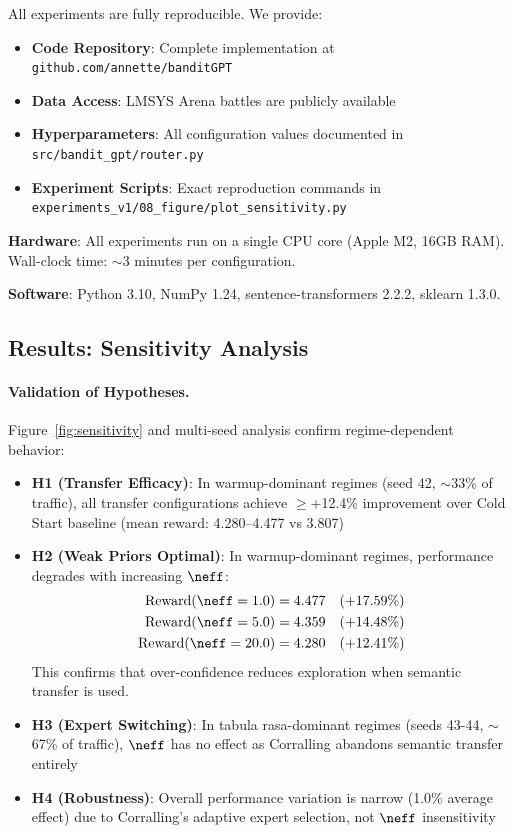 All experiments are fully reproducible. We provide:
\begin{itemize}[leftmargin=*, itemsep=2pt]
    \item \textbf{Code Repository}: Complete implementation at \texttt{github.com/annette/banditGPT}
    \item \textbf{Data Access}: LMSYS Arena battles are publicly available~\cite{zheng2023judging}
    \item \textbf{Hyperparameters}: All configuration values documented in \texttt{src/bandit\_gpt/router.py}
    \item \textbf{Experiment Scripts}: Exact reproduction commands in \texttt{experiments\_v1/08\_figure/plot\_sensitivity.py}
\end{itemize}

\textbf{Hardware}: All experiments run on a single CPU core (Apple M2, 16GB RAM). Wall-clock time: $\sim$3 minutes per configuration.

\textbf{Software}: Python 3.10, NumPy 1.24, sentence-transformers 2.2.2, sklearn 1.3.0.

\subsection{Results: Sensitivity Analysis}
\label{sec:sensitivity_results}

\paragraph{Validation of Hypotheses.}
Figure~\ref{fig:sensitivity} and multi-seed analysis confirm regime-dependent behavior:
\begin{itemize}[leftmargin=*, itemsep=2pt]
    \item \textbf{H1 (Transfer Efficacy)}: In warmup-dominant regimes (seed 42, $\sim$33\% of traffic), all transfer configurations achieve $\geq$+12.4\% improvement over Cold Start baseline (mean reward: 4.280--4.477 vs 3.807)
    
    \item \textbf{H2 (Weak Priors Optimal)}: In warmup-dominant regimes, performance degrades with increasing $\neff$:
    \begin{align*}
    \text{Reward}(\neff=1.0) &= 4.477 \quad (+17.59\%) \\
    \text{Reward}(\neff=5.0) &= 4.359 \quad (+14.48\%) \\
    \text{Reward}(\neff=20.0) &= 4.280 \quad (+12.41\%)
    \end{align*}
    This confirms that over-confidence reduces exploration when semantic transfer is used.
    
    \item \textbf{H3 (Expert Switching)}: In tabula rasa-dominant regimes (seeds 43-44, $\sim$67\% of traffic), $\neff$ has no effect as Corralling abandons semantic transfer entirely
    
    \item \textbf{H4 (Robustness)}: Overall performance variation is narrow (1.0\% average effect) due to Corralling's adaptive expert selection, not $\neff$ insensitivity
\end{itemize}

